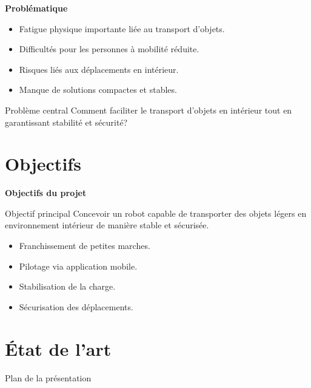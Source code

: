 \documentclass[10pt,aspectratio=169]{beamer}
\begin{document}
\begin{frame}{\textbf{Problématique}}

\begin{itemize}
    \item<1-> Fatigue physique importante liée au transport d’objets.
    \item<2-> Difficultés pour les personnes à mobilité réduite.
    \item<3-> Risques liés aux déplacements en intérieur.
    \item<4-> Manque de solutions compactes et stables.
\end{itemize}

\begin{alertblock}{Problème central}
Comment faciliter le transport d’objets en intérieur  
tout en garantissant stabilité et sécurité?
\end{alertblock}

\end{frame}

\section{Objectifs}

\begin{frame}{\textbf{Objectifs du projet}}

\begin{block}{Objectif principal}
Concevoir un robot capable de transporter des objets légers
en environnement intérieur de manière stable et sécurisée.
\end{block}

\begin{itemize}
    \item<1-> Franchissement de petites marches.
    \item<2-> Pilotage via application mobile.
    \item<3-> Stabilisation de la charge.
    \item<4-> Sécurisation des déplacements.
\end{itemize}

\end{frame}


\section{État de l’art}
\begin{frame}{Plan de la présentation}
\tableofcontents[currentsection, ]
\end{frame}
\end{document}
